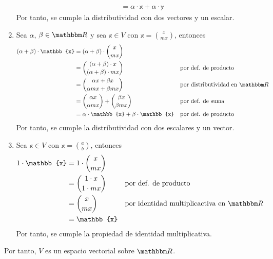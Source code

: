\begin{example}
\begin{enumerate}[label=\roman*)]
\begin{align*}
            & = \alpha \cdot \mathbb{x} + \alpha \cdot \mathbb{y}
        \end{align*}
        Por tanto, se cumple la distributividad con dos vectores y un escalar.
        \item Sea $\alpha$, $\beta \in \RR$ y sea $\mathbb{x} \in V$ con $\displaystyle \mathbb{x} = \binom{x}{mx}$, entonces
        \begin{align*}
            (\alpha + \beta) \cdot \mathbb{x} & = (\alpha + \beta) \cdot \binom{x}{mx} \\
            & = \binom{(\alpha + \beta) \cdot x}{(\alpha + \beta) \cdot mx} && \text{por def. de producto} \\
            & = \binom{\alpha x + \beta x}{\alpha mx + \beta mx} && \text{por distributividad en $\RR$} \\
            & = \binom{\alpha x}{\alpha mx} + \binom{\beta x}{\beta mx} && \text{por def. de suma} \\
            & = \alpha \cdot \mathbb{x} + \beta \cdot \mathbb{x} && \text{por def. de producto}
        \end{align*}
        Por tanto, se cumple la distributividad con dos escalares y un vector.
        \item Sea $\mathbb{x} \in V$ con $\displaystyle \mathbb{x} = \binom{a}{b}$, entonces
        \begin{align*}
            1 \cdot \mathbb{x} & = 1 \cdot \binom{x}{mx} \\
            & = \binom{1 \cdot x}{1 \cdot mx} && \text{por def. de producto} \\
            & = \binom{x}{mx} && \text{por identidad multiplicactiva en $\RR$} \\
            & = \mathbb{x}
        \end{align*}
        Por tanto, se cumple la propiedad de identidad multiplicativa.
    \end{enumerate}
    Por tanto, $V$ es un espacio vectorial sobre $\RR$.
\end{example}

